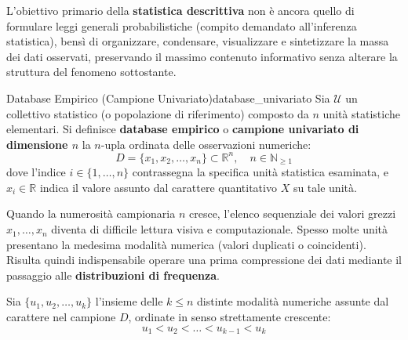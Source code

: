 L'obiettivo primario della \textbf{statistica descrittiva} non è ancora quello di formulare leggi generali probabilistiche (compito demandato all'inferenza statistica), bensì di organizzare, condensare, visualizzare e sintetizzare la massa dei dati osservati, preservando il massimo contenuto informativo senza alterare la struttura del fenomeno sottostante.

\begin{definizione}{Database Empirico (Campione Univariato)}{database_univariato}
Sia $\mathcal{U}$ un collettivo statistico (o popolazione di riferimento) composto da $n$ unità statistiche elementari. Si definisce \textbf{database empirico} o \textbf{campione univariato di dimensione $n$} la $n$-upla ordinata delle osservazioni numeriche:
\begin{equation}
D = \{x_1, x_2, \dots, x_n\} \subset \mathbb{R}^n, \quad n \in \mathbb{N}_{\ge 1}
\end{equation}
dove l'indice $i \in \{1, \dots, n\}$ contrassegna la specifica unità statistica esaminata, e $x_i \in \mathbb{R}$ indica il valore assunto dal carattere quantitativo $X$ su tale unità.
\end{definizione}

Quando la numerosità campionaria $n$ cresce, l'elenco sequenziale dei valori grezzi $x_1, \dots, x_n$ diventa di difficile lettura visiva e computazionale. Spesso molte unità presentano la medesima modalità numerica (valori duplicati o coincidenti). Risulta quindi indispensabile operare una prima compressione dei dati mediante il passaggio alle \textbf{distribuzioni di frequenza}.

Sia $\{u_1, u_2, \dots, u_k\}$ l'insieme delle $k \le n$ distinte modalità numeriche assunte dal carattere nel campione $D$, ordinate in senso strettamente crescente:
\begin{equation}
u_1 < u_2 < \dots < u_{k-1} < u_k
\end{equation}

